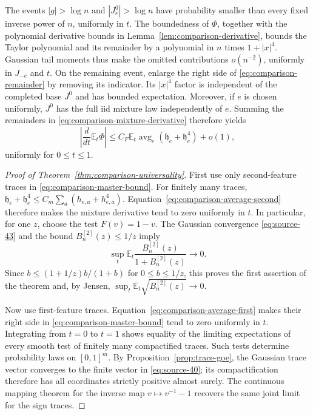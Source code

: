 The events $|g|>\log n$ and $|J_e^0|>\log n$ have probability smaller than
every fixed inverse power of $n$, uniformly in $t$.  The boundedness of
$\Phi$, together with the polynomial derivative bounds in
Lemma~\ref{lem:comparison-derivative}, bounds the Taylor polynomial and its
remainder by a polynomial in $n$ times $1+|x|^4$.  Gaussian tail moments thus
make the omitted contributions $o(n^{-2})$, uniformly in $J_{-e}$ and $t$.
On the remaining event, enlarge the right side of
\eqref{eq:comparison-remainder} by removing its indicator.  Its $|x|^4$
factor is independent of the completed base $J^0$ and has bounded expectation.
Moreover, if $e$ is chosen uniformly, $J^0$ has the full iid mixture law
independently of $e$.  Summing the remainders in
\eqref{eq:comparison-mixture-derivative} therefore yields
\begin{equation}\label{eq:comparison-master-bound}
 \left|\frac d{dt}\mathbb E_t\Phi\right|
 \le C_F\mathbb E_t\operatorname{avg}_e
             (\mathfrak h_e+\mathfrak h_e^4)+o(1),
\end{equation}
uniformly for $0\le t\le1$.

\begin{proof}[Proof of Theorem~\ref{thm:comparison-universality}]
First use only second-feature traces in \eqref{eq:comparison-master-bound}.
For finitely many traces,
$\mathfrak h_e+\mathfrak h_e^4\le C_m\sum_a(h_{e,a}+h_{e,a}^4)$.
Equation~\eqref{eq:comparison-average-second} therefore makes the mixture
derivative tend to zero uniformly in $t$.  In particular, for one $z$, choose
the test $F(v)=1-v$.  The Gaussian convergence
\eqref{eq:source-43} and the bound $B_n^{[2]}(z)\le1/z$ imply
\[
 \sup_t\mathbb E_t\frac{B_n^{[2]}(z)}{1+B_n^{[2]}(z)}\longrightarrow0.
\]
Since $b\le(1+1/z)b/(1+b)$ for $0\le b\le1/z$, this proves the first
assertion of the theorem and, by Jensen,
$\sup_t\mathbb E_t\sqrt{B_n^{[2]}(z)}\to0$.

Now use first-feature traces.  Equation~\eqref{eq:comparison-average-first}
makes their right side in \eqref{eq:comparison-master-bound} tend to zero
uniformly in $t$.  Integrating from $t=0$ to $t=1$ shows equality of the
limiting expectations of every smooth test of finitely many compactified
traces.  Such tests determine probability laws on $[0,1]^m$.  By
Proposition~\ref{prop:trace-goe}, the Gaussian trace vector converges to the
finite vector in \eqref{eq:source-40}; its compactification therefore has
all coordinates strictly positive almost surely.  The continuous mapping
theorem for the inverse map $v\mapsto v^{-1}-1$ recovers the same joint
limit for the sign traces.
\end{proof}
